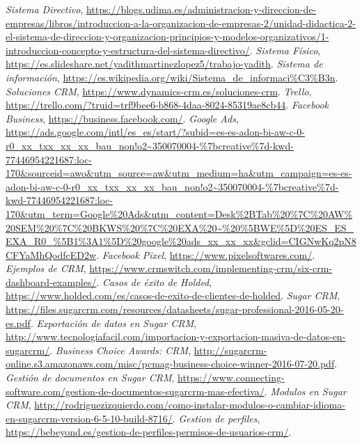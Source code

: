 \documentclass{article}
\begin{document}
\begin{thebibliography}{9}

 \textit{Sistema Directivo}, \url{https://blogs.udima.es/administracion-y-direccion-de-empresas/libros/introduccion-a-la-organizacion-de-empresas-2/unidad-didactica-2-el-sistema-de-direccion-y-organizacion-principios-y-modelos-organizativos/1-introduccion-concepto-y-estructura-del-sistema-directivo/}.
 \textit{Sistema Físico}, \url{https://es.slideshare.net/yadithmartinezlopez5/trabajo-yadith}.
 \textit{Sistema de información}, \url{https://es.wikipedia.org/wiki/Sistema_de_informaci\%C3\%B3n}.
 \textit{Soluciones CRM}, \url{https://www.dynamics-crm.es/soluciones-crm}.
 \textit{Trello}, \url{https://trello.com/?truid=trf9bee6-b868-4daa-8024-85319ae8cb44}.
 \textit{Facebook Business}, \url{https://business.facebook.com/}.
 \textit{Google Ads}, \url{https://ads.google.com/intl/es_es/start/?subid=es-es-adon-bi-aw-c-0-r0_xx_txx_xx_xx_bau_non!o2~350070004-\%7bcreative\%7d-kwd-77446954221687:loc-170&sourceid=awo&utm_source=aw&utm_medium=ha&utm_campaign=es-es-adon-bi-aw-c-0-r0_xx_txx_xx_xx_bau_non!o2~350070004-\%7bcreative\%7d-kwd-77446954221687:loc-170&utm_term=Google\%20Ads&utm_content=Desk\%2BTab\%20\%7C\%20AW\%20SEM\%20\%7C\%20BKWS\%20\%7C\%20EXA\%20~\%20\%5BWE\%5D\%20ES_ES_EXA_R0_\%5B1\%3A1\%5D\%20google\%20ads_xx_xx_xx&gclid=CIGNwKq2pN8CFYaMhQodfcED2w}.
 \textit{Facebook Pixel}, \url{https://www.pixelsoftwares.com/}.
 \textit{Ejemplos de CRM}, \url{https://www.crmswitch.com/implementing-crm/six-crm-dashboard-examples/}.
 \textit{Casos de éxito de Holded}, \url{https://www.holded.com/es/casos-de-exito-de-clientes-de-holded}.
 \textit{Sugar CRM}, \url{https://files.sugarcrm.com/resources/datasheets/sugar-professional-2016-05-20-es.pdf}.
 \textit{Exportación de datos en Sugar CRM}, \url{http://www.tecnologiafacil.com/importacion-y-exportacion-masiva-de-datos-en-sugarcrm/}.
 \textit{Business Choice Awards: CRM}, \url{http://sugarcrm-online.s3.amazonaws.com/misc/pcmag-business-choice-winner-2016-07-20.pdf}.
 \textit{Gestión de documentos en Sugar CRM}, \url{https://www.connecting-software.com/gestion-de-documentos-sugarcrm-mas-efectiva/}.
 \textit{Modulos en Sugar CRM}, \url{http://rodriguezizquierdo.com/como-instalar-modulos-o-cambiar-idioma-en-sugarcrm-version-6-5-10-build-8716/}.
 \textit{Gestion de perfiles}, \url{https://bebeyond.es/gestion-de-perfiles-permisos-de-usuarios-crm/}.

\end{thebibliography}
\end{document}
